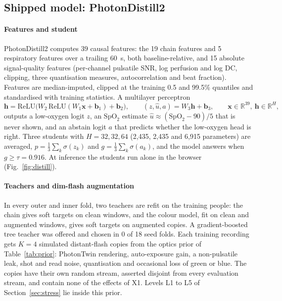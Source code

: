 \documentclass[11pt,letterpaper]{article}
\newcommand{\spo}{\ensuremath{\mathrm{SpO}_2}}
\begin{document}
\subsection{Shipped model: PhotonDistill2}\label{sec:distill}
\paragraph{Features and student} PhotonDistill2 computes 39 causal features: the 19 chain features and 5 respiratory features over a trailing 60~s, both baseline-relative, and 15 absolute signal-quality features (per-channel pulsatile SNR, log perfusion and log DC, clipping, three quantisation measures, autocorrelation and beat fraction). Features are median-imputed, clipped at the training 0.5 and 99.5\% quantiles and standardised with training statistics. A multilayer perceptron
\begin{equation}
\mathbf h=\mathrm{ReLU}\big(W_2\,\mathrm{ReLU}(W_1\mathbf x+\mathbf b_1)+\mathbf b_2\big),\qquad (z,\hat u,a)=W_3\mathbf h+\mathbf b_3,\qquad \mathbf x\in\mathbb R^{39},\ \mathbf h\in\mathbb R^{H},
\end{equation}
outputs a low-oxygen logit $z$, an \spo{} estimate $\hat u\approx(\spo-90)/5$ that is never shown, and an abstain logit $a$ that predicts whether the low-oxygen head is right. Three students with $H=32,32,64$ (2,435, 2,435 and 6,915 parameters) are averaged, $p=\frac13\sum_k\sigma(z_k)$ and $g=\frac13\sum_k\sigma(a_k)$, and the model answers when $g\ge\tau=0.916$. At inference the students run alone in the browser (Fig.~\ref{fig:distill}).

\paragraph{Teachers and dim-flash augmentation} In every outer and inner fold, two teachers are refit on the training people: the chain gives soft targets on clean windows, and the colour model, fit on clean and augmented windows, gives soft targets on augmented copies. A gradient-boosted tree teacher was offered and chosen in 0 of 18 seed folds. Each training recording gets $K=4$ simulated distant-flash copies from the optics prior of Table~\ref{tab:prior}: PhotonTwin rendering, auto-exposure gain, a non-pulsatile leak, shot and read noise, quantisation and occasional loss of green or blue. The copies have their own random stream, asserted disjoint from every evaluation stream, and contain none of the effects of X1. Levels L1 to L5 of Section~\ref{sec:stress} lie inside this prior.
\end{document}
